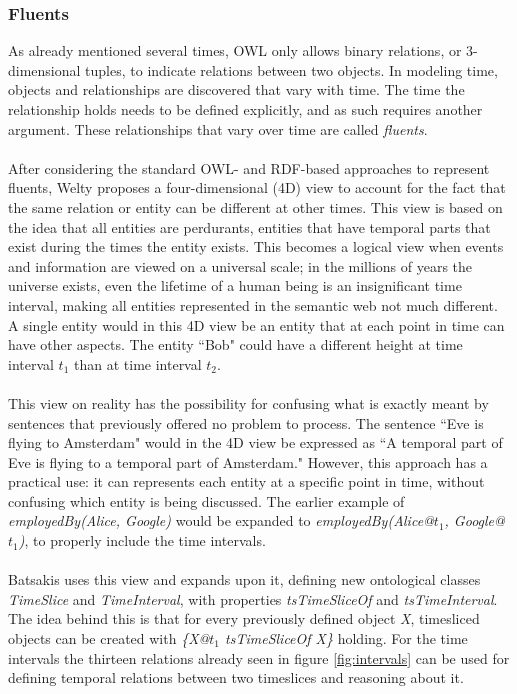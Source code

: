 \documentclass{llncs}
\begin{document}
\subsubsection{Fluents}
As already mentioned several times, OWL only allows binary relations, or 3-dimensional tuples, to indicate relations between two objects. In modeling time, objects and relationships are discovered that vary with time. The time the relationship holds needs to be defined explicitly, and as such requires another argument. These relationships that vary over time are called \emph{fluents}.\\
\\
After considering the standard OWL- and RDF-based approaches to represent fluents, Welty proposes a four-dimensional (4D) view to account for the fact that the same relation or entity can be different at other times.\cite{Welty2006} This view is based on the idea that all entities are perdurants, entities that have temporal parts that exist during the times the entity exists. This becomes a logical view when events and information are viewed on a universal scale; in the millions of years the universe exists, even the lifetime of a human being is an insignificant time interval, making all entities represented in the semantic web not much different. A single entity would in this 4D view be an entity that at each point in time can have other aspects. The entity ``Bob" could have a different height at time interval $t_1$ than at time interval $t_2$.\\
\\
This view on reality has the possibility for confusing what is exactly meant by sentences that previously offered no problem to process. The sentence ``Eve is flying to Amsterdam" would in the 4D view be expressed as ``A temporal part of Eve is flying to a temporal part of Amsterdam." However, this approach has a practical use: it can represents each entity at a specific point in time, without confusing which entity is being discussed. The earlier example of \emph{employedBy(Alice, Google)} would be expanded to \emph{employedBy(Alice@$t_1$, Google@$t_1$)}, to properly include the time intervals.\\
\\
Batsakis uses this view and expands upon it, defining new ontological classes \emph{TimeSlice} and \emph{TimeInterval}, with properties \emph{tsTimeSliceOf} and \emph{tsTimeInterval}.\cite{Batsakis2011} The idea behind this is that for every previously defined object \emph{X}, timesliced objects can be created with \emph{\{X@$t_1$ tsTimeSliceOf X\}} holding. For the time intervals the thirteen relations already seen in figure \ref{fig:intervals} can be used for defining temporal relations between two timeslices and reasoning about it.
\end{document}
